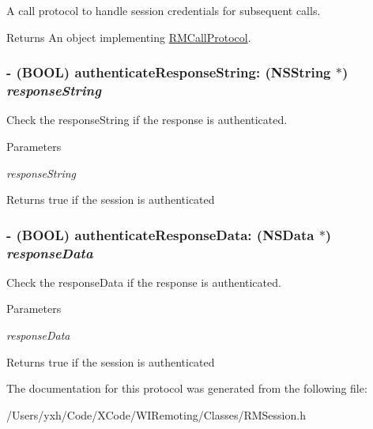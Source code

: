A call protocol to handle session credentials for subsequent calls. \begin{DoxyReturn}{Returns}
An object implementing \hyperlink{protocol_r_m_call_protocol-p}{RMCallProtocol}. 
\end{DoxyReturn}
\hypertarget{protocol_r_m_authenticator-p_adf5dc80e89981e86b61d1720ad441c79}{
\subsubsection[{authenticateResponseString:}]{\setlength{\rightskip}{0pt plus 5cm}-\/ (BOOL) authenticateResponseString: ({\bf NSString} $\ast$) {\em responseString}}}
\label{protocol_r_m_authenticator-p_adf5dc80e89981e86b61d1720ad441c79}


Check the responseString if the response is authenticated. 
\begin{DoxyParams}{Parameters}
\item[{\em responseString}]\end{DoxyParams}
\begin{DoxyReturn}{Returns}
true if the session is authenticated 
\end{DoxyReturn}
\hypertarget{protocol_r_m_authenticator-p_aa82480a76b720c6497425661de692eea}{
\subsubsection[{authenticateResponseData:}]{\setlength{\rightskip}{0pt plus 5cm}-\/ (BOOL) authenticateResponseData: (NSData $\ast$) {\em responseData}}}
\label{protocol_r_m_authenticator-p_aa82480a76b720c6497425661de692eea}


Check the responseData if the response is authenticated. 
\begin{DoxyParams}{Parameters}
\item[{\em responseData}]\end{DoxyParams}
\begin{DoxyReturn}{Returns}
true if the session is authenticated 
\end{DoxyReturn}


The documentation for this protocol was generated from the following file:\begin{DoxyCompactItemize}
\item 
/Users/yxh/Code/XCode/WIRemoting/Classes/RMSession.h\end{DoxyCompactItemize}
